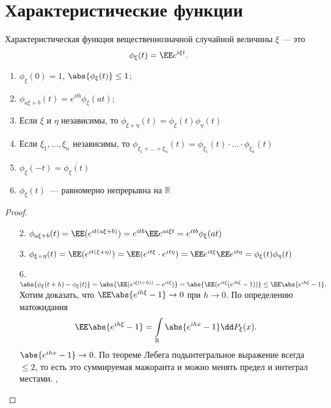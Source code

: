\section{Характеристические функции}

 \begin{definition} Характеристическая функция вещественнозначной случайной величины $\xi$ --- это
     $$\phi_\xi(t) = \EE e^{i\xi t}.$$
 \end{definition}

 \begin{properties}
\enewline
     \begin{enumerate}
         \item $\phi_\xi(0) = 1$, $\abs{\phi_\xi(t)}\le 1$;

         \item $\phi_{a\xi + b}(t) = e^{itb}\phi_\xi (at)$;
              
         \item Если $\xi$ и $\eta$ независимы, то $\phi_{\xi + \eta}(t) = \phi_\xi(t)\phi_\eta(t)$

         \item Если $\xi_1, \ldots, \xi_n$ независимы, то $\phi_{\xi_1 + \ldots + \xi_n}(t) = \phi_{\xi_1}(t)\cdot\ldots\cdot \phi_{\xi_n}(t)$

         \item $\phi_\xi(-t) = \overline{\phi_\xi(t)}$

         \item $\phi_\xi(t)$~--- равномерно непрерывна на $\mathbb{R}$

     \end{enumerate}
 \end{properties}
 
 \begin{proof}
 \enewline
 \begin{enumerate}
     \item[2.] $\phi_{a\xi + b}(t) = \EE (e^{it(a\xi + b)}) = e^{itb}\EE e^{ai\xi t} = e^{itb}\phi_\xi(at)$
     \item[3.]  $\phi_{\xi + \eta}(t) = \EE (e^{it(\xi + \eta)}) = \EE (e^{it\xi}\cdot e^{it\eta}) = \EE e^{it\xi}\EE e^{it\eta} = \phi_\xi(t)\phi_\eta(t)$
     \item[6.]  $\abs{\phi_\xi(t + h) -\phi_\xi(t)} = \abs{\EE (e^{i\xi(t+h))} - e^{it\xi})} = \abs{\EE (e^{it\xi}(e^{ih\xi} - 1))} \le \EE \abs{e^{ih\xi} - 1}.$
     Хотим доказать, что $\EE \abs{e^{ih\xi} - 1} \to 0$ при $h \to 0$. По определению матожидания
     $$\EE \abs{e^{ih\xi} - 1} = \int\limits_\mathbb{R}\abs{e^{ihx} - 1}\dd P_\xi(x).$$
     $\abs{e^{ihx} - 1} \to 0$. По теореме Лебега подынтегральное выражение всегда $\le 2$, то есть это суммируемая мажоранта и можно менять предел и интеграл местами. ,
     \qedhere
 \end{enumerate}
 \end{proof}
 

